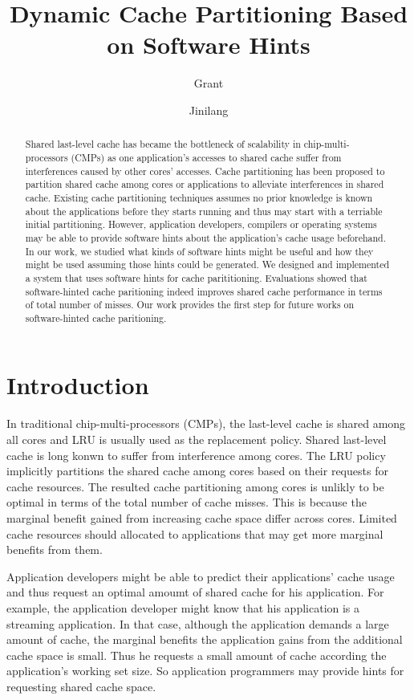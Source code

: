 \documentclass{acm_proc_article-sp}
\title{Dynamic Cache Partitioning Based on Software Hints}
\author{Grant \and Jinilang}
\begin{document}
\maketitle

\begin{abstract}

Shared last-level cache has became the bottleneck of scalability in 
chip-multi-processors (CMPs) as one application's accesses to shared 
cache suffer from interferences caused by other cores' accesses. Cache 
partitioning has been proposed to partition shared cache among cores or
applications to alleviate interferences in shared cache. Existing cache
partitioning techniques assumes no prior knowledge is known about the 
applications before they starts running and thus may start with a terriable
initial partitioning. However, application developers, compilers or operating
systems may be able to provide software hints about the application's cache
usage beforehand. In our work, we studied what kinds of software hints might be 
useful and how they might be used assuming those hints could be generated. We
designed and implemented a system that uses software hints for cache 
parititioning. Evaluations showed that software-hinted cache paritioning indeed
improves shared cache performance in terms of total number of misses. Our work
provides the first step for future works on software-hinted cache paritioning.

\end{abstract}

\section{Introduction}

In traditional chip-multi-processors (CMPs), the last-level cache is 
shared among all cores and LRU is usually used as the replacement policy. Shared
last-level cache is long konwn to suffer from interference among cores. The 
LRU policy implicitly partitions the shared cache among cores based on their 
requests for cache resources. The resulted cache partitioning among cores is
unlikly to be optimal in terms of the total number of cache misses. This is 
because the marginal benefit gained from increasing cache space differ across 
cores. Limited cache resources should allocated to applications that may get
more marginal benefits from them.

Application developers might be able to predict their applications' cache usage 
and thus request an optimal amoumt of shared cache for his application. For 
example, the application developer might know that his application is a 
streaming application. In that case, although the application demands a large 
amount of cache, the marginal benefits the application gains from the additional
cache space is small. Thus he requests a small amount of cache according the 
application's working set size. So application programmers may provide hints for
requesting shared cache space.
\end{document}
